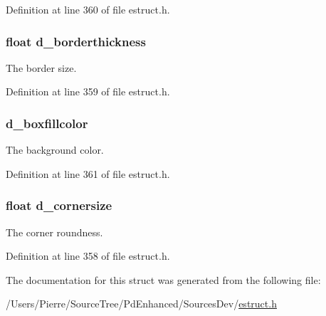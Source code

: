 Definition at line 360 of file estruct.\-h.

\hypertarget{struct__edrawparams_a9c360cb962f79a835ed0457d1dad34b5}{
\subsubsection[{d\-\_\-borderthickness}]{\setlength{\rightskip}{0pt plus 5cm}float d\-\_\-borderthickness}}\label{struct__edrawparams_a9c360cb962f79a835ed0457d1dad34b5}
The border size. 

Definition at line 359 of file estruct.\-h.

\hypertarget{struct__edrawparams_aaf0259436a4f71d6659c0447e4b98e2b}{
\subsubsection[{d\-\_\-boxfillcolor}]{ d\-\_\-boxfillcolor}}\label{struct__edrawparams_aaf0259436a4f71d6659c0447e4b98e2b}
The background color. 

Definition at line 361 of file estruct.\-h.

\hypertarget{struct__edrawparams_aabe78053b56e3bf3df55c7b85fa251b2}{
\subsubsection[{d\-\_\-cornersize}]{\setlength{\rightskip}{0pt plus 5cm}float d\-\_\-cornersize}}\label{struct__edrawparams_aabe78053b56e3bf3df55c7b85fa251b2}
The corner roundness. 

Definition at line 358 of file estruct.\-h.



The documentation for this struct was generated from the following file\-:\begin{DoxyCompactItemize}
\item 
/\-Users/\-Pierre/\-Source\-Tree/\-Pd\-Enhanced/\-Sources\-Dev/\hyperlink{estruct_8h}{estruct.\-h}\end{DoxyCompactItemize}
